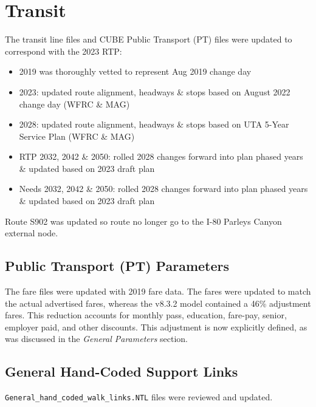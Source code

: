 \documentclass[
  letterpaper,
  DIV=11,
  numbers=noendperiod,
  titlepage=false]{scrreprt}
\providecommand{\tightlist}{%
  \setlength{\itemsep}{0pt}\setlength{\parskip}{0pt}}\usepackage{longtable,booktabs,array}
\begin{document}
\hypertarget{transit}{%
\section{Transit}\label{transit}}

The transit line files and CUBE Public Transport (PT) files were updated
to correspond with the 2023 RTP:

\begin{itemize}
\tightlist
\item
  2019 was thoroughly vetted to represent Aug 2019 change day
\item
  2023: updated route alignment, headways \& stops based on August 2022
  change day (WFRC \& MAG)
\item
  2028: updated route alignment, headways \& stops based on UTA 5-Year
  Service Plan (WFRC \& MAG)
\item
  RTP 2032, 2042 \& 2050: rolled 2028 changes forward into plan phased
  years \& updated based on 2023 draft plan
\item
  Needs 2032, 2042 \& 2050: rolled 2028 changes forward into plan phased
  years \& updated based on 2023 draft plan
\end{itemize}

Route S902 was updated so route no longer go to the I-80 Parleys Canyon
external node.

\hypertarget{public-transport-pt-parameters}{%
\subsection{Public Transport (PT)
Parameters}\label{public-transport-pt-parameters}}

The fare files were updated with 2019 fare data. The fares were updated
to match the actual advertised fares, whereas the v8.3.2 model contained
a 46\% adjustment fares. This reduction accounts for monthly pass,
education, fare-pay, senior, employer paid, and other discounts. This
adjustment is now explicitly defined, as was discussed in the
\emph{General Parameters} section.

\hypertarget{general-hand-coded-support-links}{%
\subsection{General Hand-Coded Support
Links}\label{general-hand-coded-support-links}}

\texttt{General\_hand\_coded\_walk\_links.NTL} files were reviewed and
updated.
\end{document}
